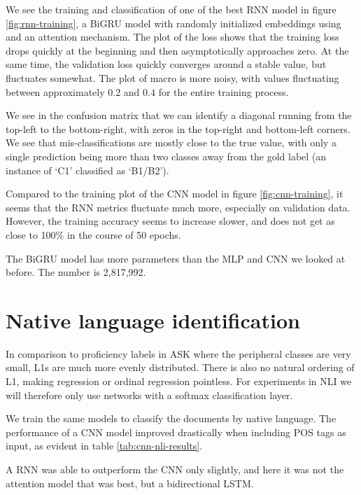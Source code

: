 We see the training and classification of one of the best RNN model in figure
\ref{fig:rnn-training}, a BiGRU model with randomly initialized embeddings
using and an attention mechanism. The plot of the loss shows that the
training loss drops quickly at the beginning and then asymptotically
approaches zero. At the same time, the validation loss quickly converges
around a stable value, but fluctuates somewhat. The plot of macro \FI is more
noisy, with values fluctuating between approximately $0.2$ and $0.4$ for the
entire training process.

We see in the confusion matrix that we can identify a diagonal running from
the top-left to the bottom-right, with zeros in the top-right and bottom-left
corners. We see that mis-classifications are mostly close to the true value,
with only a single prediction being more than two classes away from the gold
label (an instance of `C1' classified as `B1/B2').

Compared to the training plot of the CNN model in figure
\ref{fig:cnn-training}, it seems that the RNN metrics fluctuate much more,
especially on validation data. However, the training accuracy seems to
increase slower, and does not get as close to 100\% in the course of 50 epochs.

The BiGRU model has more parameters than the MLP and CNN we looked at before.
The number is 2,817,992.


\section{Native language identification} \label{sec:nli-experiments}

In comparison to proficiency labels in ASK where the peripheral classes are
very small, \acp{L1} are much more evenly distributed. There is also no natural
ordering of \ac{L1}, making regression or ordinal regression pointless. For
experiments in \ac{NLI} we will therefore only use networks with a softmax
classification layer.

We train the same models to classify the documents by native language. The
performance of a \ac{CNN} model improved drastically when including \ac{POS}
tags as input, as evident in table \ref{tab:cnn-nli-results}.

A RNN was able to outperform the CNN only slightly, and here it was not the
attention model that was best, but a bidirectional LSTM.

